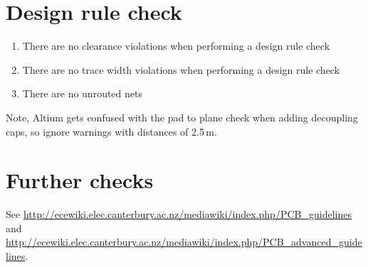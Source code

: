 \documentclass[a4paper, 12pt]{article}
\begin{document}
\section*{Design rule check}

\begin{enumerate}
\item There are no clearance violations when performing a design rule check

\item There are no trace width violations when performing a design rule check  

\item There are no unrouted nets  
\end{enumerate}  

Note, Altium gets confused with the pad to plane check when adding
decoupling caps, so ignore warnings with distances of 2.5\,m.

  
\section*{Further checks}

See
\url{http://ecewiki.elec.canterbury.ac.nz/mediawiki/index.php/PCB_guidelines}
and
\url{http://ecewiki.elec.canterbury.ac.nz/mediawiki/index.php/PCB_advanced_guidelines}.
\end{document}

